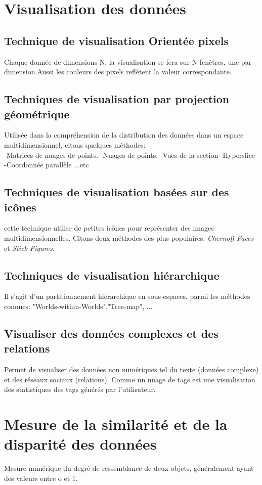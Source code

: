 \documentclass[12pt,a4paper,oneside]{book}
\begin{document}
\section{Visualisation des données}
\subsection{Technique de visualisation Orientée pixels}
Chaque donnée de dimensions N, la visualisation se fera sur N fenêtres, une par dimension.Aussi les couleurs des pixels reflètent la valeur correspondante.

\subsection{Techniques de visualisation par projection géométrique}
Utilisée dans la compréhension de la distribution des données dans un espace multidimensionnel, citons quelques méthodes:\\
-Matrices de nuages de points.
-Nuages de points.
-Vues de la section
-Hyperslice
-Coordonnée parallèle
...etc

\subsection{Techniques de visualisation basées sur des icônes}
cette technique utilise de petites icônes pour représenter des images multidimensionnelles.
Citons deux méthodes des plus populaires: \textit{Chernoff Faces} et \textit{Stick Figures}.

\subsection{Techniques de visualisation hiérarchique}
Il s'agit d'un partitionnement hiérarchique en sous-espaces, parmi les méthodes connues:
"Worlds-within-Worlds","Tree-map", ...

\subsection{Visualiser des données complexes et des relations}
Permet de visualiser des données non numériques tel du texte (données complexe) et des réseaux sociaux (relations).
Comme un nuage de tags est une visualisation des statistiques des tags générés par l'utilisateur.


\section{Mesure de la similarité et de la disparité des données}
Mesure numérique du degré de ressemblance de deux objets, généralement ayant des valeurs entre o et 1.
\end{document}
